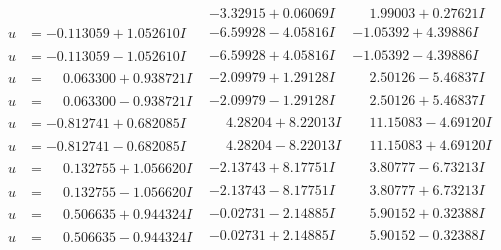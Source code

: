 \documentclass[1p]{elsarticle_modified}
\theoremstyle{definition}
\begin{document}
$$\begin{array}{c|c|c}
 & -3.32915 + 0.06069 I & \phantom{-}1.99003 + 0.27621 I \\ \hline\begin{aligned}
u &= -0.113059 + 1.052610 I\end{aligned}
 & -6.59928 - 4.05816 I & -1.05392 + 4.39886 I \\ \hline\begin{aligned}
u &= -0.113059 - 1.052610 I\end{aligned}
 & -6.59928 + 4.05816 I & -1.05392 - 4.39886 I \\ \hline\begin{aligned}
u &= \phantom{-}0.063300 + 0.938721 I\end{aligned}
 & -2.09979 + 1.29128 I & \phantom{-}2.50126 - 5.46837 I \\ \hline\begin{aligned}
u &= \phantom{-}0.063300 - 0.938721 I\end{aligned}
 & -2.09979 - 1.29128 I & \phantom{-}2.50126 + 5.46837 I \\ \hline\begin{aligned}
u &= -0.812741 + 0.682085 I\end{aligned}
 & \phantom{-}4.28204 + 8.22013 I & \phantom{-}11.15083 - 4.69120 I \\ \hline\begin{aligned}
u &= -0.812741 - 0.682085 I\end{aligned}
 & \phantom{-}4.28204 - 8.22013 I & \phantom{-}11.15083 + 4.69120 I \\ \hline\begin{aligned}
u &= \phantom{-}0.132755 + 1.056620 I\end{aligned}
 & -2.13743 + 8.17751 I & \phantom{-}3.80777 - 6.73213 I \\ \hline\begin{aligned}
u &= \phantom{-}0.132755 - 1.056620 I\end{aligned}
 & -2.13743 - 8.17751 I & \phantom{-}3.80777 + 6.73213 I \\ \hline\begin{aligned}
u &= \phantom{-}0.506635 + 0.944324 I\end{aligned}
 & -0.02731 - 2.14885 I & \phantom{-}5.90152 + 0.32388 I \\ \hline\begin{aligned}
u &= \phantom{-}0.506635 - 0.944324 I\end{aligned}
 & -0.02731 + 2.14885 I & \phantom{-}5.90152 - 0.32388 I \\ \hline\begin{aligned}

\end{aligned}
\end{array}$$
\end{document}
